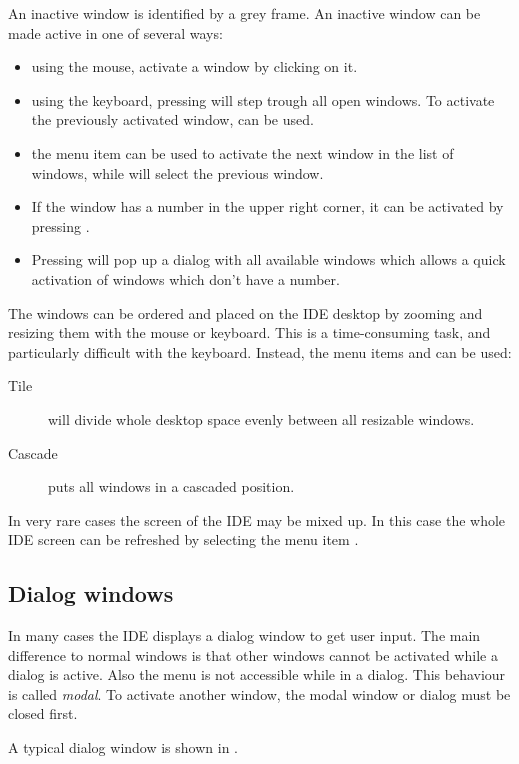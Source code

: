 An inactive window is identified by a grey frame. An inactive window can
be made active in one of several ways:
\begin{itemize}
\item using the mouse, activate a window by clicking on it.
\item using the keyboard, pressing  will step trough all open 
windows. To activate the previously activated window,  can
be used.
\item the menu item  can be used to activate the next 
window in the list of windows, while  will select
the previous window.
\item If the window has a number in the upper right corner, it can be
activated by pressing .
\item Pressing  will pop up a dialog with all 
available windows which allows a quick activation of windows which 
don't have a number.
\end{itemize}

The windows can be ordered and placed on the IDE desktop by zooming and
resizing them with the mouse or keyboard. This is a time-consuming task, 
and particularly difficult with the keyboard. Instead, the menu items
 and  can be used:
\begin{description}
\item[Tile] will divide whole desktop space evenly between all resizable 
windows. 
\item[Cascade] puts all windows in a cascaded position. 
\end{description}

In very rare cases the screen of the IDE may be mixed up. In this
case the whole IDE screen can be refreshed by selecting the menu item 
.
%
%
\subsection{Dialog windows}
\label{se:dialogwindow}
In many cases the IDE displays a dialog window to get user input.
The main difference to normal windows is that other windows cannot be
activated while a dialog is active. Also the menu is not accessible while in
a dialog. This behaviour is called \emph{modal}. To activate another window, 
the modal window or dialog must be closed first.

A typical dialog window is shown in .

